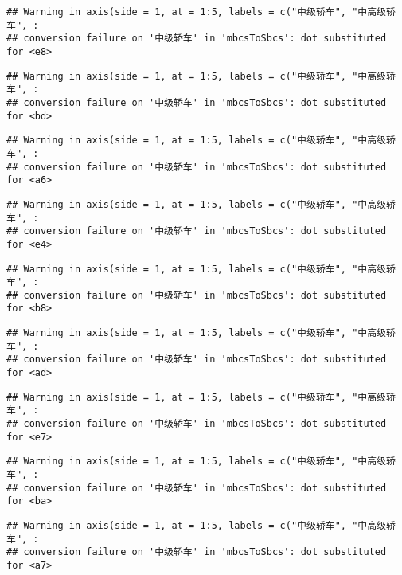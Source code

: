 \documentclass[]{article}
\begin{document}
\begin{verbatim}
## Warning in axis(side = 1, at = 1:5, labels = c("中级轿车", "中高级轿车", :
## conversion failure on '中级轿车' in 'mbcsToSbcs': dot substituted for <e8>
\end{verbatim}

\begin{verbatim}
## Warning in axis(side = 1, at = 1:5, labels = c("中级轿车", "中高级轿车", :
## conversion failure on '中级轿车' in 'mbcsToSbcs': dot substituted for <bd>
\end{verbatim}

\begin{verbatim}
## Warning in axis(side = 1, at = 1:5, labels = c("中级轿车", "中高级轿车", :
## conversion failure on '中级轿车' in 'mbcsToSbcs': dot substituted for <a6>
\end{verbatim}

\begin{verbatim}
## Warning in axis(side = 1, at = 1:5, labels = c("中级轿车", "中高级轿车", :
## conversion failure on '中级轿车' in 'mbcsToSbcs': dot substituted for <e4>
\end{verbatim}

\begin{verbatim}
## Warning in axis(side = 1, at = 1:5, labels = c("中级轿车", "中高级轿车", :
## conversion failure on '中级轿车' in 'mbcsToSbcs': dot substituted for <b8>
\end{verbatim}

\begin{verbatim}
## Warning in axis(side = 1, at = 1:5, labels = c("中级轿车", "中高级轿车", :
## conversion failure on '中级轿车' in 'mbcsToSbcs': dot substituted for <ad>
\end{verbatim}

\begin{verbatim}
## Warning in axis(side = 1, at = 1:5, labels = c("中级轿车", "中高级轿车", :
## conversion failure on '中级轿车' in 'mbcsToSbcs': dot substituted for <e7>
\end{verbatim}

\begin{verbatim}
## Warning in axis(side = 1, at = 1:5, labels = c("中级轿车", "中高级轿车", :
## conversion failure on '中级轿车' in 'mbcsToSbcs': dot substituted for <ba>
\end{verbatim}

\begin{verbatim}
## Warning in axis(side = 1, at = 1:5, labels = c("中级轿车", "中高级轿车", :
## conversion failure on '中级轿车' in 'mbcsToSbcs': dot substituted for <a7>
\end{verbatim}
\end{document}
